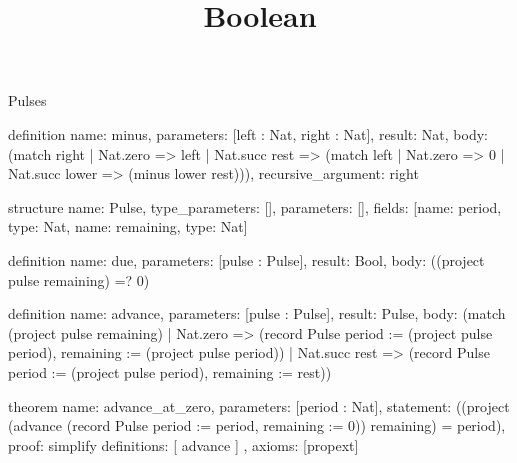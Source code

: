 \begin{lexlean}{Pulses}
\title{Boolean}
\begin{semanticmodule}
definition{
  name: minus,
  parameters: [left : Nat, right : Nat],
  result: Nat,
  body: (match right
    | Nat.zero => left
    | Nat.succ rest => (match left
      | Nat.zero => 0
      | Nat.succ lower => (minus lower rest))),
  recursive_argument: right
}

structure{
  name: Pulse,
  type_parameters: [],
  parameters: [],
  fields: [{name: period, type: Nat}, {name: remaining, type: Nat}]
}

definition{
  name: due,
  parameters: [pulse : Pulse],
  result: Bool,
  body: ((project pulse remaining) =? 0)
}

definition{
  name: advance,
  parameters: [pulse : Pulse],
  result: Pulse,
  body: (match (project pulse remaining)
    | Nat.zero => (record Pulse {period := (project pulse period), remaining := (project pulse period)})
    | Nat.succ rest => (record Pulse {period := (project pulse period), remaining := rest}))
}

theorem{
  name: advance_at_zero,
  parameters: [period : Nat],
  statement: ((project (advance (record Pulse {period := period, remaining := 0})) remaining) = period),
  proof: simplify{
    definitions: [
      advance
    ]
  },
  axioms: [propext]
}
\end{semanticmodule}
\end{lexlean}
